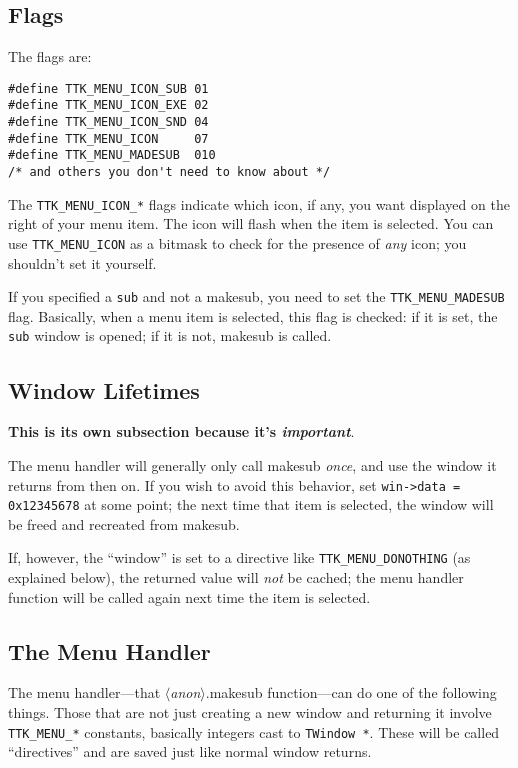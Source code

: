 \documentclass[12pt,letterpaper]{report}
\let\ttt\tt
\def\tt{\def\_{{\ttt\char`\_}}\ttt}
\def\<#1>{\leavevmode\hbox{$\langle${\sl#1\/}$\rangle$}}
\begin{document}
\subsection{Flags}
The flags are:
\begin{verbatim}
#define TTK_MENU_ICON_SUB 01
#define TTK_MENU_ICON_EXE 02
#define TTK_MENU_ICON_SND 04
#define TTK_MENU_ICON     07
#define TTK_MENU_MADESUB  010
/* and others you don't need to know about */
\end{verbatim}

The \verb|TTK_MENU_ICON_*| flags indicate which icon, if any, you want displayed on the right of your
menu item. The icon will flash when the item is selected. You can use \verb|TTK_MENU_ICON| as a bitmask
to check for the presence of \emph{any} icon; you shouldn't set it yourself.

If you specified a {\tt sub} and not a {\sf makesub}, you need to set the \verb|TTK_MENU_MADESUB| flag.
Basically, when a menu item is selected, this flag is checked: if it is set, the {\tt sub} window
is opened; if it is not, {\sf makesub} is called.

\subsection{Window Lifetimes}
{\bf This is its own subsection because it's {\itshape important}}.

The menu handler will generally only call {\sf makesub} \emph{once}, and use
the window it returns from then on. If you wish to avoid this behavior, set \verb|win->data = 0x12345678|
at some point; the next time that item is selected, the window will be freed and recreated from {\sf makesub}.

If, however, the ``window'' is set to a directive like \verb|TTK_MENU_DONOTHING| (as explained below),
the returned value will \emph{not} be cached; the menu handler function will be called again next time
the item is selected.

\subsection{The Menu Handler}
The menu handler---that {\sf \<anon>.makesub} function---can do one of the following things. Those that
are not just creating a new window and returning it involve \verb|TTK_MENU_*| constants, basically
integers cast to \verb|TWindow *|. These will be called ``directives'' and are saved just like normal
window returns.
\end{document}
